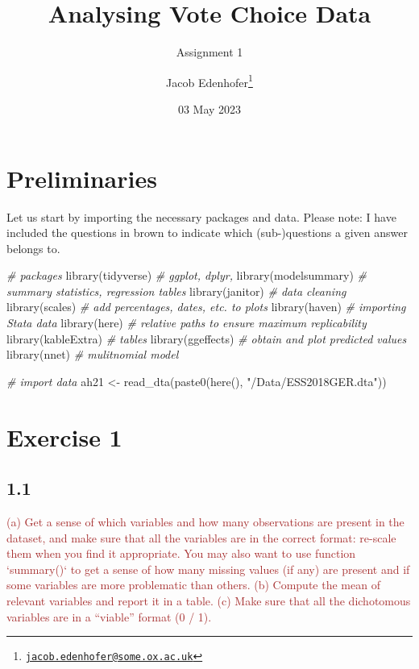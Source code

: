 \documentclass[
]{article}
\title{Analysing Vote Choice Data}
\subtitle{Assignment 1}
\author{Jacob Edenhofer\footnote{\href{mailto:jacob.edenhofer@some.ox.ac.uk}{\nolinkurl{jacob.edenhofer@some.ox.ac.uk}}}}
\date{03 May 2023}
\newenvironment{Shaded}{\begin{snugshade}}{\end{snugshade}}
\newcommand{\CommentTok}[1]{\textcolor[rgb]{0.56,0.35,0.01}{\textit{#1}}}
\newcommand{\FunctionTok}[1]{\textcolor[rgb]{0.00,0.00,0.00}{#1}}
\newcommand{\NormalTok}[1]{#1}
\newcommand{\OtherTok}[1]{\textcolor[rgb]{0.56,0.35,0.01}{#1}}
\newcommand{\StringTok}[1]{\textcolor[rgb]{0.31,0.60,0.02}{#1}}
\begin{document}
\maketitle

\hypertarget{preliminaries}{%
\section{Preliminaries}\label{preliminaries}}

Let us start by importing the necessary packages and data. Please note:
I have included the questions in brown to indicate which (sub-)questions
a given answer belongs to.

\begin{Shaded}
\begin{Highlighting}[]
\CommentTok{\# packages}
\FunctionTok{library}\NormalTok{(tidyverse) }\CommentTok{\# ggplot, dplyr, }
\FunctionTok{library}\NormalTok{(modelsummary) }\CommentTok{\# summary statistics, regression tables}
\FunctionTok{library}\NormalTok{(janitor) }\CommentTok{\# data cleaning }
\FunctionTok{library}\NormalTok{(scales) }\CommentTok{\# add percentages, dates, etc. to plots }
\FunctionTok{library}\NormalTok{(haven) }\CommentTok{\# importing Stata data}
\FunctionTok{library}\NormalTok{(here) }\CommentTok{\# relative paths to ensure maximum replicability }
\FunctionTok{library}\NormalTok{(kableExtra) }\CommentTok{\# tables}
\FunctionTok{library}\NormalTok{(ggeffects) }\CommentTok{\# obtain and plot predicted values }
\FunctionTok{library}\NormalTok{(nnet) }\CommentTok{\# mulitnomial model}

\CommentTok{\# import data}
\NormalTok{ah21 }\OtherTok{\textless{}{-}} \FunctionTok{read\_dta}\NormalTok{(}\FunctionTok{paste0}\NormalTok{(}\FunctionTok{here}\NormalTok{(), }\StringTok{"/Data/ESS2018GER.dta"}\NormalTok{))}
\end{Highlighting}
\end{Shaded}

\hypertarget{exercise-1}{%
\section{Exercise 1}\label{exercise-1}}

\hypertarget{section}{%
\subsection{1.1}\label{section}}

\textcolor{brown}{(a) Get a sense of which variables and how many observations are present in the dataset, and make sure that all the variables are in the correct format: re-scale them when you find it appropriate. You may also want to use function `summary()` to get a sense of how many missing values (if any) are present and if some variables are more problematic than others.
(b) Compute the mean of relevant variables and report it in a table.
(c) Make sure that all the dichotomous variables are in a “viable” format (0 / 1).}
\end{document}
